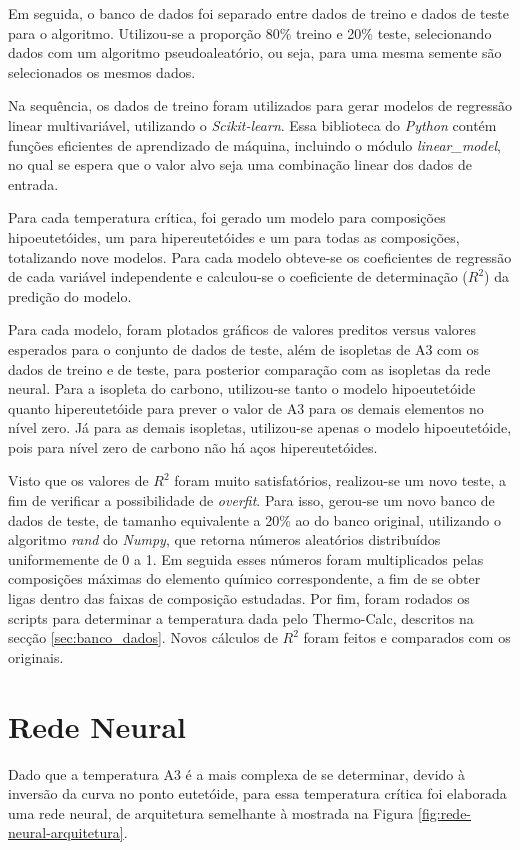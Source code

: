 \documentclass[brazil,tf,epusp]{usp}  %
\begin{document}
Em seguida, o banco de dados foi separado entre dados de treino e dados de teste para o algoritmo. Utilizou-se a proporção 80\% treino e 20\% teste, selecionando dados com um algoritmo pseudoaleatório, ou seja, para uma mesma semente são selecionados os mesmos dados.

Na sequência, os dados de treino foram utilizados para gerar modelos de regressão linear multivariável, utilizando o \textit{Scikit-learn}. Essa biblioteca do \textit{Python} contém funções eficientes de aprendizado de máquina, incluindo o módulo \textit{linear\_model}, no qual se espera que o valor alvo seja uma combinação linear dos dados de entrada.

Para cada temperatura crítica, foi gerado um modelo para composições hipoeutetóides, um para hipereutetóides e um para todas as composições, totalizando nove modelos. Para cada modelo obteve-se os coeficientes de regressão de cada variável independente e calculou-se o coeficiente de determinação ($R^{2}$) da predição do modelo.

Para cada modelo, foram plotados gráficos de valores preditos versus valores esperados para o conjunto de dados de teste, além de isopletas de A3 com os dados de treino e de teste, para posterior comparação com as isopletas da rede neural. Para a isopleta do carbono, utilizou-se tanto o modelo hipoeutetóide quanto hipereutetóide para prever o valor de A3 para os demais elementos no nível zero. Já para as demais isopletas, utilizou-se apenas o modelo hipoeutetóide, pois para nível zero de carbono não há aços hipereutetóides.

Visto que os valores de $R^{2}$ foram muito satisfatórios, realizou-se um novo teste, a fim de verificar a possibilidade de \textit{overfit}. Para isso, gerou-se um novo banco de dados de teste, de tamanho equivalente a 20\% ao do banco original, utilizando o algoritmo \textit{rand} do \textit{Numpy}, que retorna números aleatórios distribuídos uniformemente de 0 a 1. Em seguida esses números foram multiplicados pelas composições máximas do elemento químico correspondente, a fim de se obter ligas dentro das faixas de composição estudadas. Por fim, foram rodados os scripts para determinar a temperatura dada pelo Thermo-Calc\textregistered{}, descritos na secção \ref{sec:banco_dados}. Novos cálculos de $R^{2}$ foram feitos e comparados com os originais.

\section{Rede Neural}
Dado que a temperatura A3 é a mais complexa de se determinar, devido à inversão da curva no ponto eutetóide, para essa temperatura crítica foi elaborada uma rede neural, de arquitetura semelhante à mostrada na Figura \ref{fig:rede-neural-arquitetura}.
\end{document}
